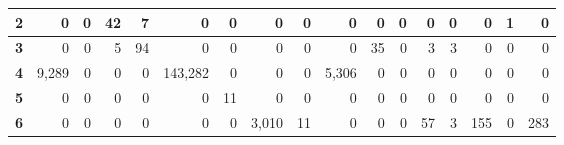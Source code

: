 \begin{table}[H]
\begin{tabular}{rrrrrrrrrrrrrrrrr}
\multicolumn{1}{|r|}{\textbf{2}}     & \multicolumn{1}{r|}{0}          & \multicolumn{1}{r|}{0}          & \multicolumn{1}{r|}{42}         & \multicolumn{1}{r|}{7}          & \multicolumn{1}{r|}{0}          & \multicolumn{1}{r|}{0}          & \multicolumn{1}{r|}{0}          & \multicolumn{1}{r|}{0}          & \multicolumn{1}{r|}{0}          & \multicolumn{1}{r|}{0}          & \multicolumn{1}{r|}{0}           & \multicolumn{1}{r|}{0}           & \multicolumn{1}{r|}{0}           & \multicolumn{1}{r|}{0}           & \multicolumn{1}{r|}{1}           & \multicolumn{1}{r|}{0}           \\ \hline
\multicolumn{1}{|r|}{\textbf{3}}     & \multicolumn{1}{r|}{0}          & \multicolumn{1}{r|}{0}          & \multicolumn{1}{r|}{5}          & \multicolumn{1}{r|}{94}         & \multicolumn{1}{r|}{0}          & \multicolumn{1}{r|}{0}          & \multicolumn{1}{r|}{0}          & \multicolumn{1}{r|}{0}          & \multicolumn{1}{r|}{0}          & \multicolumn{1}{r|}{35}         & \multicolumn{1}{r|}{0}           & \multicolumn{1}{r|}{3}           & \multicolumn{1}{r|}{3}           & \multicolumn{1}{r|}{0}           & \multicolumn{1}{r|}{0}           & \multicolumn{1}{r|}{0}           \\ \hline
\multicolumn{1}{|r|}{\textbf{4}}     & \multicolumn{1}{r|}{9,289}       & \multicolumn{1}{r|}{0}          & \multicolumn{1}{r|}{0}          & \multicolumn{1}{r|}{0}          & \multicolumn{1}{r|}{143,282}     & \multicolumn{1}{r|}{0}          & \multicolumn{1}{r|}{0}          & \multicolumn{1}{r|}{0}          & \multicolumn{1}{r|}{5,306}       & \multicolumn{1}{r|}{0}          & \multicolumn{1}{r|}{0}           & \multicolumn{1}{r|}{0}           & \multicolumn{1}{r|}{0}           & \multicolumn{1}{r|}{0}           & \multicolumn{1}{r|}{0}           & \multicolumn{1}{r|}{0}           \\ \hline
\multicolumn{1}{|r|}{\textbf{5}}     & \multicolumn{1}{r|}{0}          & \multicolumn{1}{r|}{0}          & \multicolumn{1}{r|}{0}          & \multicolumn{1}{r|}{0}          & \multicolumn{1}{r|}{0}          & \multicolumn{1}{r|}{11}         & \multicolumn{1}{r|}{0}          & \multicolumn{1}{r|}{0}          & \multicolumn{1}{r|}{0}          & \multicolumn{1}{r|}{0}          & \multicolumn{1}{r|}{0}           & \multicolumn{1}{r|}{0}           & \multicolumn{1}{r|}{0}           & \multicolumn{1}{r|}{0}           & \multicolumn{1}{r|}{0}           & \multicolumn{1}{r|}{0}           \\ \hline
\multicolumn{1}{|r|}{\textbf{6}}     & \multicolumn{1}{r|}{0}          & \multicolumn{1}{r|}{0}          & \multicolumn{1}{r|}{0}          & \multicolumn{1}{r|}{0}          & \multicolumn{1}{r|}{0}          & \multicolumn{1}{r|}{0}          & \multicolumn{1}{r|}{3,010}       & \multicolumn{1}{r|}{11}         & \multicolumn{1}{r|}{0}          & \multicolumn{1}{r|}{0}          & \multicolumn{1}{r|}{0}           & \multicolumn{1}{r|}{57}          & \multicolumn{1}{r|}{3}           & \multicolumn{1}{r|}{155}         & \multicolumn{1}{r|}{0}           & \multicolumn{1}{r|}{283}         \\ \hline

\end{tabular}
\end{table}
